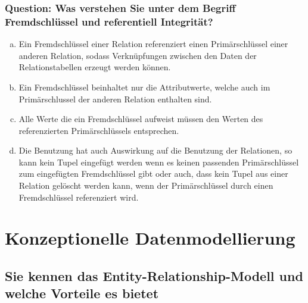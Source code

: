 \documentclass{article}
\begin{document}
\begin{adjustwidth}{2em}{2em}
\begin{adjustwidth}{2em}{2em}
\begin{adjustwidth}{1em}{}
				\subsubsection*{Question: Was verstehen Sie unter dem Begriff Fremdschlüssel und referentiell Integrität?}
				\begin{adjustwidth}{1em}{}
					\begin{enumerate}[(a)]
						\item Ein Fremdschlüssel einer Relation referenziert einen Primärschlüssel einer anderen Relation, sodass Verknüpfungen zwischen den Daten der Relationstabellen erzeugt werden können.
						\item Ein Fremdschlüssel beinhaltet nur die Attributwerte, welche auch im Primärschlussel der anderen Relation enthalten sind.
						\item Alle Werte die ein Fremdschlüssel aufweist müssen den Werten des referenzierten Primärschlüssels entsprechen.
						\item Die Benutzung hat auch Auswirkung auf die Benutzung der Relationen, so kann kein Tupel eingefügt werden wenn es keinen passenden Primärschlüssel zum eingefügten Fremdschlüssel gibt oder auch, dass kein Tupel aus einer Relation gelöscht werden kann, wenn der Primärschlüssel durch einen Fremdschlüssel referenziert wird.
					\end{enumerate}
				\end{adjustwidth}
			\end{adjustwidth}			
		\end{adjustwidth}
		
		\newpage
			
		\section{Konzeptionelle Datenmodellierung}
		\begin{adjustwidth}{2em}{2em}
			\subsection{Sie kennen das Entity-Relationship-Modell und welche Vorteile es bietet}
			\begin{adjustwidth}{1em}{}

\end{adjustwidth}
\end{adjustwidth}
\end{adjustwidth}
\end{document}
